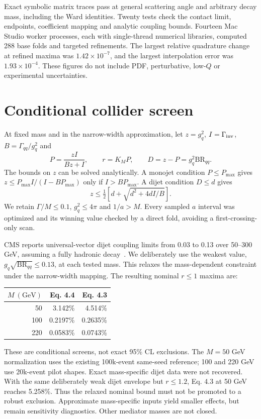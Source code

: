 \documentclass[11pt,a4paper]{article}
\begin{document}
Exact symbolic matrix traces pass at general scattering angle and arbitrary
decay mass, including the Ward identities. Twenty tests check the contact
limit, endpoints, coefficient mapping and analytic coupling bounds. Fourteen
Mac Studio worker processes, each with single-thread numerical libraries,
computed 288 base folds and targeted refinements. The largest relative
quadrature change at refined maxima was $1.42\times10^{-7}$, and the largest
interpolation error was $1.93\times10^{-4}$. These figures do not include
PDF, perturbative, low-$Q$ or experimental uncertainties.

\section{Conditional collider screen}
At fixed mass and in the narrow-width approximation, let $z=g_q^2$,
$I=\Gamma_{\rm inv}$, $B=\Gamma_{qq}/g_q^2$ and
\begin{equation}
 P=\frac{zI}{Bz+I},\qquad r=K_M P,\qquad D=z-P=g_q^2\mathrm{BR}_{qq}.
\end{equation}
The bounds on $z$ can be solved analytically. A monojet condition
$P\leq P_{\max}$ gives
$z\leq P_{\max}I/(I-BP_{\max})$ only if $I>BP_{\max}$.
A dijet condition $D\leq d$ gives
\begin{equation}
 z\leq\tfrac12\left[d+\sqrt{d^2+4dI/B}\right].
\end{equation}
We retain $\Gamma/M\leq0.1$, $g_q^2\leq4\pi$ and $1/a>M$.
Every sampled $a$ interval was optimized and its winning value checked by a
direct fold, avoiding a first-crossing-only scan.

CMS reports universal-vector dijet coupling limits from 0.03 to 0.13 over
50--300 GeV, assuming a fully hadronic decay~\cite{CMS}. We deliberately use
the weakest value, $g_q\sqrt{\mathrm{BR}_{qq}}\leq0.13$, at each tested mass.
This relaxes the mass-dependent constraint under the narrow-width mapping.
The resulting nominal $r\leq1$ maxima are:
\begin{center}
\begin{tabular}{rrr}
\toprule
$M\ (\mathrm{GeV})$ & Eq. 4.4 & Eq. 4.3\\
\midrule
50 & 3.142\% & 4.514\%\\
100 & 0.2197\% & 0.2635\%\\
220 & 0.0583\% & 0.0743\%\\
\bottomrule
\end{tabular}
\end{center}
These are conditional screens, not exact 95\% CL exclusions. The $M=50$ GeV
normalization uses the existing 100k-event same-seed reference; 100 and 220 GeV
use 20k-event pilot shapes. Exact mass-specific dijet data were not recovered.
With the same deliberately weak dijet envelope but $r\leq1.2$, Eq. 4.3 at
50 GeV reaches 5.258\%. Thus the relaxed nominal bound must not be promoted
to a robust exclusion. Approximate mass-specific inputs yield smaller effects,
but remain sensitivity diagnostics. Other mediator masses are not closed.
\end{document}
